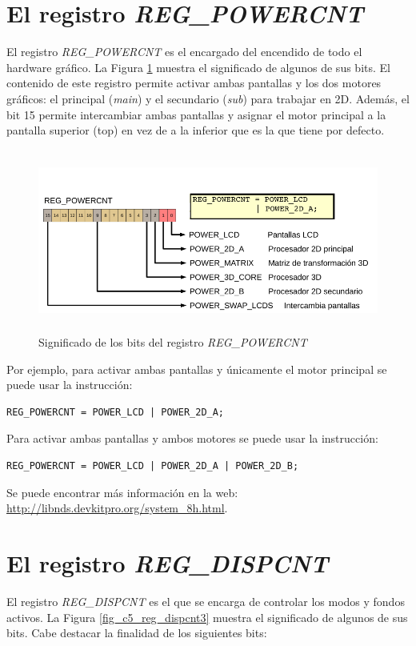\section{El registro \textit{REG\_POWERCNT}} 
El registro \textit{REG\_POWERCNT} es el encargado del encendido de todo el hardware gráfico. La Figura \ref{c5_bits_reg_powercnt} muestra el significado de algunos de sus bits. El contenido de este registro permite activar ambas pantallas y los dos motores gráficos: el principal (\textit{main}) y el secundario (\textit{sub}) para trabajar en 2D. Además, el bit 15  permite intercambiar ambas pantallas y asignar el motor principal a la pantalla superior (top) en vez de a la inferior que es la que tiene por defecto.

\begin{figure}[h]
\centering
\includegraphics[height=6cm]{Figuras/C5/c5_reg_powercnt.png}
\caption{Significado de los bits del registro \textit{REG\_POWERCNT}}
\label{c5_bits_reg_powercnt}
\end{figure}

Por ejemplo, para activar ambas pantallas y únicamente el motor principal se puede usar la instrucción:
\begin{verbatim}
REG_POWERCNT = POWER_LCD | POWER_2D_A;
\end{verbatim}

Para activar ambas pantallas y ambos motores se puede usar la instrucción:
\begin{verbatim}
REG_POWERCNT = POWER_LCD | POWER_2D_A | POWER_2D_B;
\end{verbatim}

Se puede encontrar más información en la web: \url{http://libnds.devkitpro.org/system_8h.html}. 



\section{El registro \textit{REG\_DISPCNT}} 
El registro \textit{REG\_DISPCNT} es el que se encarga de controlar los modos y fondos activos. La Figura \ref{fig_c5_reg_dispcnt3} muestra el significado de algunos de sus bits. Cabe destacar la finalidad de los siguientes bits:

